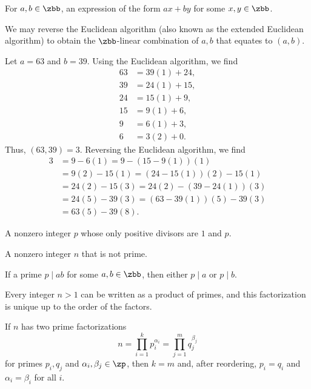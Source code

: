  For $a, b \in \zbb$, an expression of the form $ax + by$ for some $x, y \in \zbb$.

\begin{note}
    We may reverse the Euclidean algorithm (also known as the extended Euclidean algorithm) to obtain the $\zbb$-linear combination of $a, b$ that equates to $(a, b)$.
\end{note}

\begin{example}
    Let $a = 63$ and $b = 39$. Using the Euclidean algorithm, we find
    \begin{align*}
        63 &= 39(1) + 24, \\
        39 &= 24(1) + 15, \\
        24 &= 15(1) + 9, \\
        15 &= 9(1) + 6, \\
        9 &= 6(1) + 3, \\
        6 &= 3(2) + 0.
    \end{align*}
    Thus, $(63, 39) = 3$. Reversing the Euclidean algorithm, we find
    \begin{align*}
        3 &= 9 - 6(1) = 9 - (15 - 9(1))(1) \\
        &= 9(2) - 15(1) = (24 - 15(1))(2) - 15(1) \\
        &= 24(2) - 15(3) = 24(2) - (39 - 24(1))(3) \\
        &= 24(5) - 39(3) = (63 - 39(1))(5) - 39(3) \\
        &= 63(5) - 39(8).
    \end{align*}
\end{example}

 A nonzero integer $p$ whose only positive divisors are $1$ and $p$.

 A nonzero integer $n$ that is not prime.

\begin{note}
    If a prime $p \mid ab$ for some $a, b \in \zbb$, then either $p \mid a$ or $p \mid b$.
\end{note}

 Every integer $n > 1$ can be written as a product of primes, and this factorization is unique up to the order of the factors.

\begin{note}
    If $n$ has two prime factorizations
    \[
        n = \prod_{i=1}^k p_i^{\alpha_i} = \prod_{j=1}^m q_j^{\beta_j}
    \]
    for primes $p_i, q_j$ and $\alpha_i, \beta_j \in \zp$, then $k = m$ and, after reordering, $p_i = q_i$ and $\alpha_i = \beta_i$ for all $i$.
\end{note}

